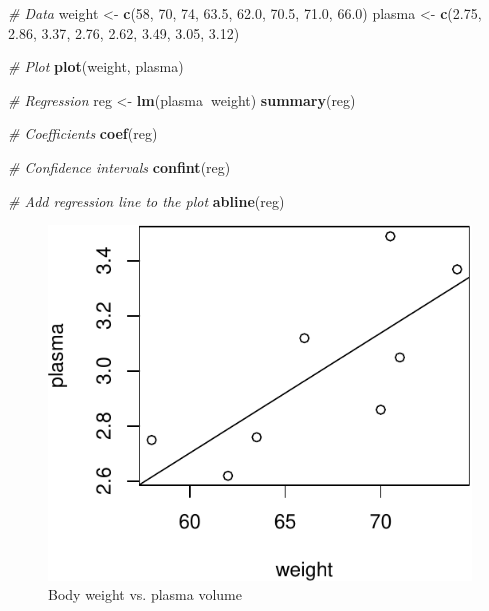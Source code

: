 \documentclass[]{article}
\newenvironment{Shaded}{\begin{snugshade}}{\end{snugshade}}
\newcommand{\CommentTok}[1]{\textcolor[rgb]{0.56,0.35,0.01}{\textit{#1}}}
\newcommand{\DecValTok}[1]{\textcolor[rgb]{0.00,0.00,0.81}{#1}}
\newcommand{\FloatTok}[1]{\textcolor[rgb]{0.00,0.00,0.81}{#1}}
\newcommand{\KeywordTok}[1]{\textcolor[rgb]{0.13,0.29,0.53}{\textbf{#1}}}
\newcommand{\NormalTok}[1]{#1}
\newcommand{\OperatorTok}[1]{\textcolor[rgb]{0.81,0.36,0.00}{\textbf{#1}}}
\newcommand{\StringTok}[1]{\textcolor[rgb]{0.31,0.60,0.02}{#1}}
\begin{document}
\begin{Shaded}
\begin{Highlighting}[]
\CommentTok{# Data}
\NormalTok{weight <-}\StringTok{ }\KeywordTok{c}\NormalTok{(}\DecValTok{58}\NormalTok{, }\DecValTok{70}\NormalTok{, }\DecValTok{74}\NormalTok{, }\FloatTok{63.5}\NormalTok{, }\FloatTok{62.0}\NormalTok{, }\FloatTok{70.5}\NormalTok{, }\FloatTok{71.0}\NormalTok{, }\FloatTok{66.0}\NormalTok{)}
\NormalTok{plasma <-}\StringTok{ }\KeywordTok{c}\NormalTok{(}\FloatTok{2.75}\NormalTok{, }\FloatTok{2.86}\NormalTok{, }\FloatTok{3.37}\NormalTok{, }\FloatTok{2.76}\NormalTok{, }\FloatTok{2.62}\NormalTok{, }\FloatTok{3.49}\NormalTok{, }\FloatTok{3.05}\NormalTok{, }\FloatTok{3.12}\NormalTok{) }

\CommentTok{# Plot}
\KeywordTok{plot}\NormalTok{(weight, plasma)}

\CommentTok{# Regression}
\NormalTok{reg <-}\StringTok{ }\KeywordTok{lm}\NormalTok{(plasma}\OperatorTok{~}\NormalTok{weight)}
\KeywordTok{summary}\NormalTok{(reg)}

\CommentTok{# Coefficients}
\KeywordTok{coef}\NormalTok{(reg)}

\CommentTok{# Confidence intervals}
\KeywordTok{confint}\NormalTok{(reg)}

\CommentTok{# Add regression line to the plot}
\KeywordTok{abline}\NormalTok{(reg)}
\end{Highlighting}
\end{Shaded}

\begin{figure}[H]

{\centering \includegraphics{session-regression-I-files/figures/unnamed-chunk-3-1} 

}

\caption{Body weight vs. plasma volume}\label{fig:unnamed-chunk-3}
\end{figure}
\end{document}
